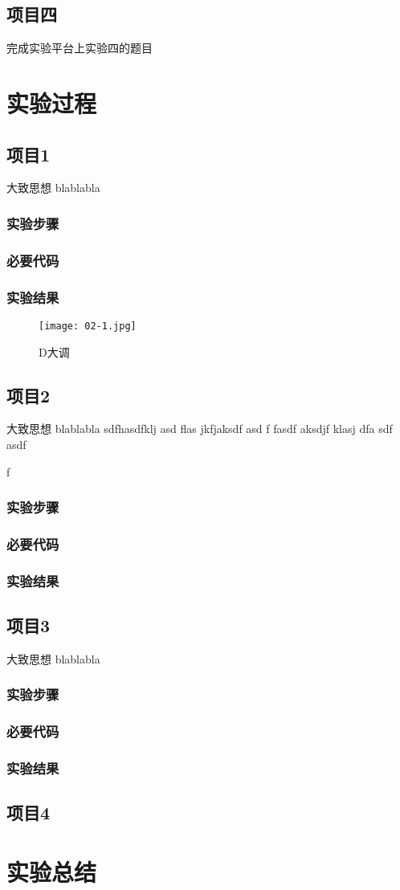 \subsection{项目四}
完成实验平台上实验四的题目

\section{实验过程}
\subsection{项目1}
大致思想 blablabla
\subsubsection{实验步骤}
\subsubsection{必要代码}

\subsubsection{实验结果}
	\begin{figure}[!bthp]
	\centering
        \texttt{[image: 02-1.jpg]}
        \caption{D大调}
      \end{figure}

\subsection{项目2}
大致思想 blablabla sdfhasdfklj asd flas jkfjaksdf asd f
fasdf aksdjf klasj dfa
sdf
asdf

f
\subsubsection{实验步骤}
\subsubsection{必要代码}
\subsubsection{实验结果}

\subsection{项目3}
大致思想 blablabla
\subsubsection{实验步骤}
\subsubsection{必要代码}
\subsubsection{实验结果}

\subsection{项目4}

\section{实验总结}


